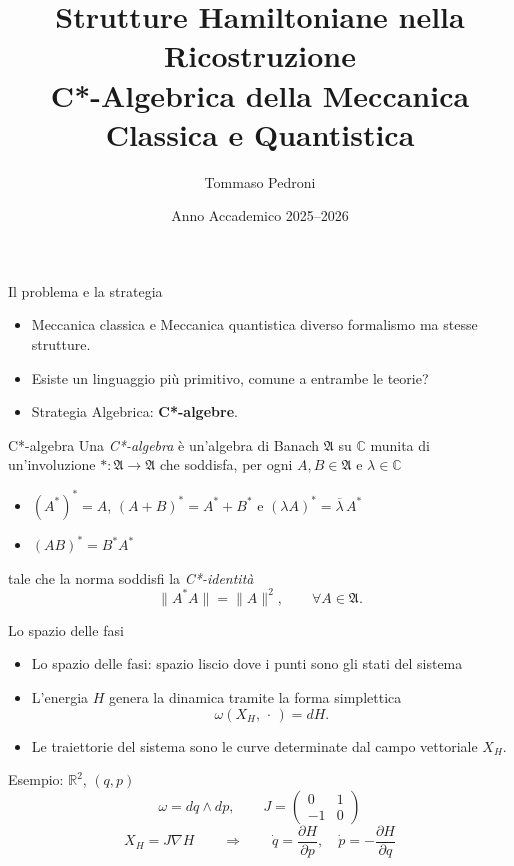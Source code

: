 \documentclass[aspectratio=169,11pt]{beamer}
\title[Strutture Hamiltoniane C*-Algebriche]{Strutture Hamiltoniane nella Ricostruzione\\ C*-Algebrica della Meccanica Classica e Quantistica}
\author{Tommaso Pedroni}
\institute{Dipartimento di Fisica ``A. Volta'' \\ Relatore: Prof. Claudio Dappiaggi}
\date{Anno Accademico 2025--2026}
\begin{document}
	
	\begin{frame}
		\titlepage
	\end{frame}
	
	
	
	\begin{frame}{Il problema e la strategia}
		\begin{itemize}
			\item Meccanica classica e  Meccanica quantistica diverso formalismo ma stesse strutture. 
			\item Esiste un linguaggio più primitivo, comune a entrambe le teorie?
			\item Strategia Algebrica: \textbf{C*-algebre}.
		\end{itemize}
		
		\begin{block}{C*-algebra}
			Una \emph{C*-algebra} è un'algebra di Banach $\mathfrak{A}$ su $\mathbb{C}$ munita di un'involuzione $*:\mathfrak{A} \to \mathfrak{A}$ che soddisfa, per ogni $A, B \in \mathfrak{A}$ e $\lambda \in \mathbb{C}$
			\begin{itemize}
				\item $(A^*)^* = A$, $(A+B)^* = A^* + B^*$ e $(\lambda A)^* = \overline{\lambda}\, A^*$
				\item $(AB)^* = B^* A^*$
			\end{itemize}
			tale che la norma soddisfi la \emph{C*-identità}
			\[
			\|A^* A\| = \|A\|^2, \qquad \forall A \in \mathfrak{A}.
			\]
		\end{block}
	\end{frame}
	
	
	\begin{frame}{Lo spazio delle fasi}
		\begin{itemize}
			\item Lo spazio delle fasi: spazio liscio dove i punti sono gli stati del sistema
			
			\item L'energia $H$ genera la dinamica tramite la forma simplettica
			\[
			\omega(X_H,\,\cdot\,) = dH.
			\]
			\item Le traiettorie del sistema sono le curve determinate dal campo vettoriale $X_H$.
		\end{itemize}
		
		\begin{block}{Esempio: $\mathbb{R}^2$, $(q,p)$}
			\[
			\omega = dq \wedge dp, \qquad J = \begin{pmatrix} 0 & 1 \\ -1 & 0 \end{pmatrix}
			\]
			\[
			X_H = J\nabla H \qquad \Longrightarrow \qquad \dot q = \frac{\partial H}{\partial p}, \quad \dot p = -\frac{\partial H}{\partial q}
			\]
		\end{block}
	\end{frame}
	
\end{document}
